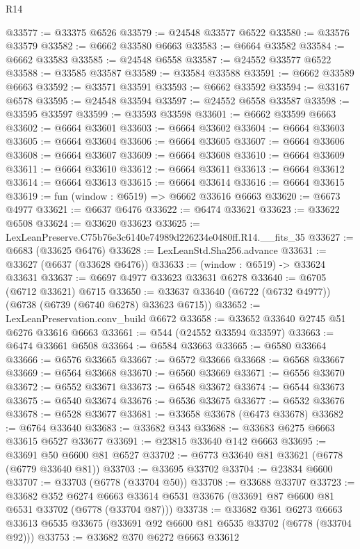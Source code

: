 \begin{lexlean}{R14}
\begin{coremodule}
@33577 := @33375 @6526
@33579 := @24548 @33577 @6522
@33580 := @33576 @33579
@33582 := @6662 @33580 @6663
@33583 := @6664 @33582
@33584 := @6662 @33583
@33585 := @24548 @6558
@33587 := @24552 @33577 @6522
@33588 := @33585 @33587
@33589 := @33584 @33588
@33591 := @6662 @33589 @6663
@33592 := @33571 @33591
@33593 := @6662 @33592
@33594 := @33167 @6578
@33595 := @24548 @33594
@33597 := @24552 @6558 @33587
@33598 := @33595 @33597
@33599 := @33593 @33598
@33601 := @6662 @33599 @6663
@33602 := @6664 @33601
@33603 := @6664 @33602
@33604 := @6664 @33603
@33605 := @6664 @33604
@33606 := @6664 @33605
@33607 := @6664 @33606
@33608 := @6664 @33607
@33609 := @6664 @33608
@33610 := @6664 @33609
@33611 := @6664 @33610
@33612 := @6664 @33611
@33613 := @6664 @33612
@33614 := @6664 @33613
@33615 := @6664 @33614
@33616 := @6664 @33615
@33619 := fun (window : @6519) => @6662 @33616 @6663
@33620 := @6673 @4977
@33621 := @6637 @6476
@33622 := @6474 @33621
@33623 := @33622 @6508
@33624 := @33620 @33623
@33625 := LexLeanPreserve.C75b76e3c6140e74989d226234e0480ff.R14.__fits_35
@33627 := @6683 (@33625 @6476)
@33628 := LexLeanStd.Sha256.advance
@33631 := @33627 (@6637 (@33628 @6476))
@33633 := (window : @6519) -> @33624 @33631
@33637 := @6697 @4977 @33623 @33631 @6278
@33640 := @6705 (@6712 @33621) @6715
@33650 := @33637 @33640 (@6722 (@6732 @4977)) (@6738 (@6739 (@6740 @6278) @33623 @6715))
@33652 := LexLeanPreservation.conv_build @6672
@33658 := @33652 @33640 @2745 @51 @6276 @33616 @6663
@33661 := @544 (@24552 @33594 @33597)
@33663 := @6474 @33661 @6508
@33664 := @6584 @33663
@33665 := @6580 @33664
@33666 := @6576 @33665
@33667 := @6572 @33666
@33668 := @6568 @33667
@33669 := @6564 @33668
@33670 := @6560 @33669
@33671 := @6556 @33670
@33672 := @6552 @33671
@33673 := @6548 @33672
@33674 := @6544 @33673
@33675 := @6540 @33674
@33676 := @6536 @33675
@33677 := @6532 @33676
@33678 := @6528 @33677
@33681 := @33658 @33678 (@6473 @33678)
@33682 := @6764 @33640
@33683 := @33682 @343
@33688 := @33683 @6275 @6663 @33615 @6527 @33677
@33691 := @23815 @33640 @142 @6663
@33695 := @33691 @50 @6600 @81 @6527
@33702 := @6773 @33640 @81 @33621 (@6778 (@6779 @33640 @81))
@33703 := @33695 @33702
@33704 := @23834 @6600
@33707 := @33703 (@6778 (@33704 @50))
@33708 := @33688 @33707
@33723 := @33682
    @352
    @6274
    @6663
    @33614
    @6531
    @33676
    (@33691 @87 @6600 @81 @6531 @33702 (@6778 (@33704 @87)))
@33738 := @33682
    @361
    @6273
    @6663
    @33613
    @6535
    @33675
    (@33691 @92 @6600 @81 @6535 @33702 (@6778 (@33704 @92)))
@33753 := @33682
    @370
    @6272
    @6663
    @33612

\end{coremodule}
\end{lexlean}
